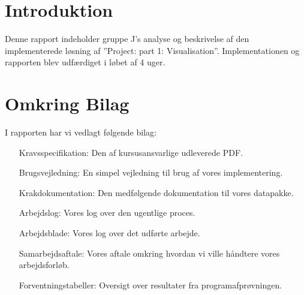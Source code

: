\section{Introduktion}
Denne rapport indeholder gruppe J's analyse og beskrivelse af den implementerede løsning af ''Project: part 1: Visualisation''. Implementationen og rapporten blev udfærdiget i løbet af 4 uger.
\section{Omkring Bilag}
I rapporten har vi vedlagt følgende bilag:
\begin{itemize}
	\item [Kravsspecifikation:] Den af kursusansvarlige udleverede PDF.
	\item [Brugsvejledning:] En simpel vejledning til brug af vores implementering.
	\item [Krakdokumentation:] Den medfølgende dokumentation til vores datapakke.
	\item [Arbejdslog:] Vores log over den ugentlige proces.
	\item [Arbejdsblade:] Vores log over det udførte arbejde.
	\item [Samarbejdsaftale:] Vores aftale omkring hvordan vi ville håndtere vores arbejdsforløb.
	\item [Forventningstabeller:] Oversigt over resultater fra programafprøvningen.
\end{itemize}

